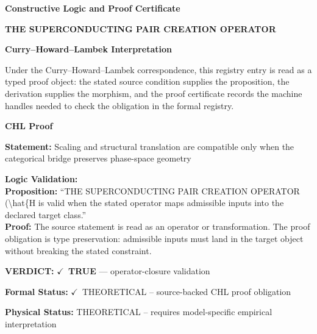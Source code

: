 \clearpage
\begingroup\tzpsupportsetup
\noindent\textbf{\fontsize{10.8pt}{12.8pt}\selectfont [ID 0595] Constructive Logic and Proof Certificate}\par
\noindent\textbf{\fontsize{10pt}{12pt}\selectfont THE SUPERCONDUCTING PAIR CREATION OPERATOR}\par
\vspace{0.45em}
\begingroup
\footnotesize
\setlength{\parskip}{0.22em}
\setlength{\parindent}{0pt}
\noindent\textbf{Curry--Howard--Lambek Interpretation}\par
Under the Curry--Howard--Lambek correspondence, this registry entry is read as a typed proof
object: the stated source condition supplies the proposition, the derivation supplies the
morphism, and the proof certificate records the machine handles needed to check the obligation
in the formal registry.

\vspace{0.45em}
\noindent\textbf{CHL Proof}\par
\textbf{Statement:} Scaling and structural translation are compatible only when the categorical bridge
preserves phase-space geometry

\textbf{Logic Validation:}\\
\textbf{Proposition:} ``THE SUPERCONDUCTING PAIR CREATION OPERATOR (\textbackslash{}hat\{H is valid when the stated operator
maps admissible inputs into the declared target class.''\\
\textbf{Proof:} The source statement is read as an operator or transformation. The proof obligation is
type preservation: admissible inputs must land in the target object without breaking the
stated constraint.

\textbf{VERDICT:} \ensuremath{\checkmark}\ \textbf{TRUE} --- operator-closure validation

\textbf{Formal Status:} \ensuremath{\checkmark}\ THEORETICAL -- source-backed CHL proof obligation

\textbf{Physical Status:} THEORETICAL -- requires model-specific empirical interpretation
\par\vspace{0.45em}
\par
\ifTZPDarkEdition
{}
\fi
\endgroup
\endgroup
